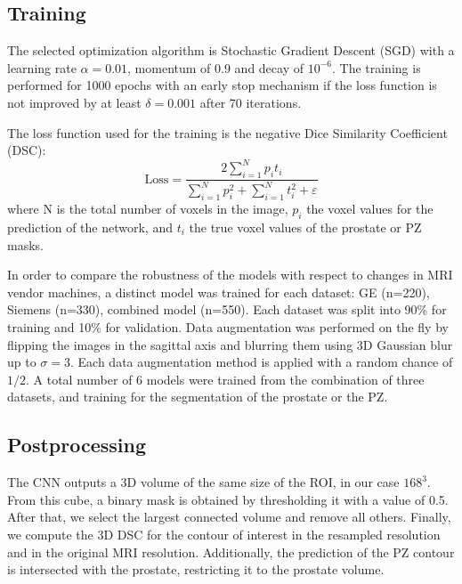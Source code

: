 \subsection{Training}
\label{subsec:training}
The selected optimization algorithm is Stochastic Gradient Descent (SGD) with a learning rate $\alpha = 0.01$, momentum of 0.9 and decay of $10^{-6}$. The training is performed for 1000 epochs with an early stop mechanism if the loss function is not improved by at least $\delta = 0.001$ after 70 iterations. 

The loss function used for the training is the negative Dice Similarity Coefficient (DSC):
\begin{equation}
\text{Loss} = \frac{2 \sum_{i=1}^{N}p_it_i}{\sum_{i=1}^{N}p_i^2 + \sum_{i=1}^{N}t_i^2 + \varepsilon} 
\label{eq:dsc}
\end{equation}
where N is the total number of voxels in the image, $p_i$ the voxel values for the prediction of the network, and $t_i$ the true voxel values of the prostate or PZ masks.

In order to compare the robustness of the models with respect to changes in MRI vendor machines,  a distinct model was trained for each dataset: GE (n=220), Siemens (n=330), combined model (n=550). Each dataset was split into 90\% for training and 10\% for validation. Data augmentation was performed on the fly by flipping the images in the sagittal axis and blurring them using 3D Gaussian blur up to $\sigma = 3$. Each data augmentation method is applied with a random chance of $1/2$.  
A total number of 6 models were trained from the combination of three datasets, and training for the segmentation of the prostate or the PZ. 

\subsection{Postprocessing}
The CNN outputs a 3D volume of the same size of the ROI, in our case $168^3$. From this cube, a binary mask is obtained by thresholding it with a value of 0.5. After that, we select the largest connected volume and remove all others. Finally, we compute the 3D DSC for the contour of interest in the resampled resolution and in the original MRI resolution. Additionally, the prediction of the PZ contour is intersected with the prostate, restricting it to the prostate volume.

